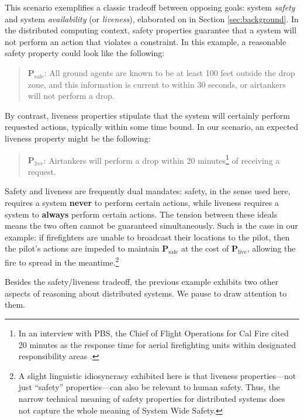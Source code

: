 \documentclass[]             %
{NASA}                       %
\theoremstyle{definition}
\begin{document}
This scenario exemplifies a classic tradeoff between opposing goals:
system \emph{safety} and system \emph{availability} (or
\emph{liveness}), elaborated on in Section \ref{sec:background}. In
the distributed computing context, safety properties guarantee that a
system will not perform an action that violates a constraint. In this
example, a reasonable safety property could look like the following:
\begin{quote}
  $\textbf{P}_\textrm{safe}$: All ground agents are known to be at
  least 100 feet outside the drop zone, and this information is
  current to within 30 seconds, or airtankers will not perform a drop.
\end{quote}
By contrast, liveness properties stipulate that the system
will certainly perform requested actions, typically within some time
bound. In our scenario, an expected liveness property might be the
following:
\begin{quote}
  $\textbf{P}_\textrm{live}$: Airtankers will perform a drop within 20
  minutes\footnote{In an interview with PBS, the Chief of Flight
  Operations for Cal Fire cited 20 \mbox{minutes} as the response time
  for aerial firefighting units within designated responsibility areas
  \cite{2021:aerialfirefighting}.} of receiving a request.
\end{quote}

Safety and liveness are frequently dual mandates: safety, in the sense
used here, requires a system \textbf{never} to perform certain
actions, while liveness requires a system to \textbf{always} perform
certain actions. The tension between these ideals means the two often
cannot be guaranteed simultaneously. Such is the case in our example:
if firefighters are unable to broadcast their locations to the pilot,
then the pilot's actions are impeded to maintain
\(\textbf{P}_\textrm{safe}\) at the cost of
\(\textbf{P}_\textrm{live}\), allowing the fire to spread in the
meantime.\footnote{A slight linguistic idiosyncrasy exhibited here is
that liveness properties---not just ``safety'' properties---can also
be relevant to human safety. Thus, the narrow technical meaning of
safety properties for distributed systems does not capture the whole
meaning of System Wide Safety.}

Besides the safety/liveness tradeoff, the previous example exhibits
two other aspects of reasoning about distributed systems. We pause to
draw attention to them.
\end{document}
